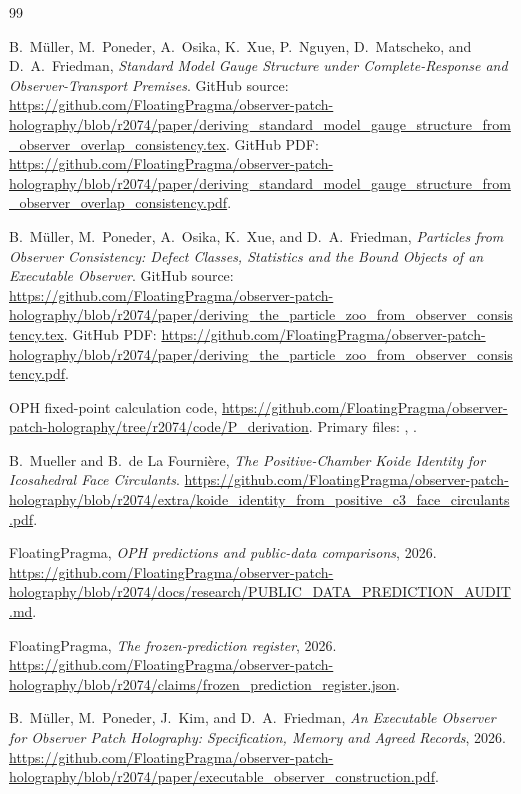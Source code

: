 \documentclass[11pt]{article}
\theoremstyle{remark}
\begin{document}
\begin{thebibliography}{99}

B.\ M\"uller, M.\ Poneder, A.\ Osika, K.\ Xue, P.\ Nguyen, D.\ Matscheko, and D.\ A.\ Friedman,
\emph{Standard Model Gauge Structure under Complete-Response and Observer-Transport Premises}.
GitHub source:
\url{https://github.com/FloatingPragma/observer-patch-holography/blob/r2074/paper/deriving_standard_model_gauge_structure_from_observer_overlap_consistency.tex}.
GitHub PDF:
\url{https://github.com/FloatingPragma/observer-patch-holography/blob/r2074/paper/deriving_standard_model_gauge_structure_from_observer_overlap_consistency.pdf}.

B.\ M\"uller, M.\ Poneder, A.\ Osika, K.\ Xue, and D.\ A.\ Friedman,
\emph{Particles from Observer Consistency: Defect Classes, Statistics and the Bound Objects of an Executable Observer}.
GitHub source:
\url{https://github.com/FloatingPragma/observer-patch-holography/blob/r2074/paper/deriving_the_particle_zoo_from_observer_consistency.tex}.
GitHub PDF:
\url{https://github.com/FloatingPragma/observer-patch-holography/blob/r2074/paper/deriving_the_particle_zoo_from_observer_consistency.pdf}.

OPH fixed-point calculation code,
\url{https://github.com/FloatingPragma/observer-patch-holography/tree/r2074/code/P_derivation}.
Primary files:
,
.

B.\ Mueller and B.\ de La Fourni\`ere,
\emph{The Positive-Chamber Koide Identity for Icosahedral Face Circulants}.
\url{https://github.com/FloatingPragma/observer-patch-holography/blob/r2074/extra/koide_identity_from_positive_c3_face_circulants.pdf}.

FloatingPragma,
\emph{OPH predictions and public-data comparisons}, 2026.
\url{https://github.com/FloatingPragma/observer-patch-holography/blob/r2074/docs/research/PUBLIC_DATA_PREDICTION_AUDIT.md}.

FloatingPragma,
\emph{The frozen-prediction register}, 2026.
\url{https://github.com/FloatingPragma/observer-patch-holography/blob/r2074/claims/frozen_prediction_register.json}.

B.~M\"uller, M.~Poneder, J.~Kim, and D.~A.~Friedman,
\emph{An Executable Observer for Observer Patch Holography: Specification,
Memory and Agreed Records}, 2026.
\url{https://github.com/FloatingPragma/observer-patch-holography/blob/r2074/paper/executable_observer_construction.pdf}.


\end{thebibliography}
\end{document}
